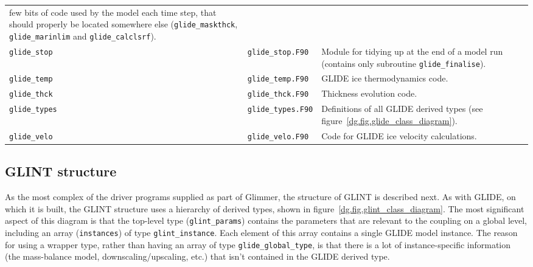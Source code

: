\begin{center}
\begin{supertabular}{|l|l|p{7cm}|}
    few bits of code used by the model each time step, that should properly be
    located somewhere else (\texttt{glide\_maskthck},
    \texttt{glide\_marinlim} and \texttt{glide\_calclsrf}).\\
    \texttt{glide\_stop} & \texttt{glide\_stop.F90} & Module for tidying up at
    the end of a model run (contains only subroutine \texttt{glide\_finalise}).\\
    \texttt{glide\_temp} & \texttt{glide\_temp.F90} & GLIDE ice thermodynamics
    code. \\
    \texttt{glide\_thck} & \texttt{glide\_thck.F90} & Thickness evolution
    code. \\
    \texttt{glide\_types} & \texttt{glide\_types.F90} & Definitions of all
    GLIDE derived types (see figure~\ref{dg.fig.glide_class_diagram}).\\
    \texttt{glide\_velo} & \texttt{glide\_velo.F90} & Code for GLIDE ice
    velocity calculations. \\

  \end{supertabular}
\end{center}

\subsection{GLINT structure}
%
As the most complex of the driver programs supplied as part of Glimmer, the
structure of GLINT is described next. As with GLIDE, on which it is built, the
GLINT structure uses a hierarchy of derived types, shown in
figure~\ref{dg.fig.glint_class_diagram}. The most significant aspect of this
diagram is that the top-level type (\texttt{glint\_params}) contains the
parameters that are relevant to the coupling on a global level, including an
array (\texttt{instances}) of type \texttt{glint\_instance}. Each element of
this array contains a single GLIDE model instance. The reason for using a
wrapper type, rather than having an array of type \texttt{glide\_global\_type},
is that there is a lot of instance-specific information (the mass-balance
model, downscaling/upscaling, etc.) that isn't contained in the GLIDE derived
type.

